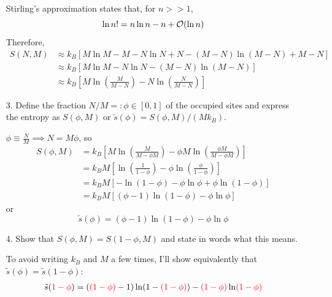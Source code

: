 \documentclass[a4paper,twoside]{article}
\begin{document}
\begin{itemize}
\begin{problem}
            Stirling's approximation states that, for $ n >> 1 $,
            \begin{equation}
                \ln n! = n\ln n - n + \order{\ln n} 
            \end{equation}
            Therefore,
            \begin{align}
                S(N,M) &\approx k_B \left[ M \ln M - M - N \ln N + N - (M - N) \ln (M - N) + M - N \right] \\
                &\approx k_B \left[ M \ln M - N \ln N - (M-N) \ln (M-N)\right] \\
                &\approx k_B \left[ M \ln\left( \frac{M}{M-N} \right) - N \ln\left( \frac{N}{M-N} \right)\right]
            \end{align}
        \end{problem}
    \item[3.] Define the fraction $ N/M =: \phi \in [0,1] $ of the occupied sites and express the entropy as $ S(\phi, M) $ or $ \tilde{s}(\phi) = S(\phi, M) / (M k_B) $.
        \begin{problem}
            $ \phi \equiv \frac{N}{M} \implies N = M \phi $, so
            \begin{align}
                S(\phi, M) &= k_B \left[ M \ln\left( \frac{M}{M - \phi M} \right) - \phi M \ln\left( \frac{\phi M}{M - \phi M} \right) \right] \\
                &= k_B M \left[ \ln\left( \frac{1}{1 - \phi} \right) - \phi\ln\left( \frac{\phi}{1-\phi} \right)\right] \\
                &= k_B M \left[ -\ln(1-\phi) - \phi\ln\phi + \phi\ln(1-\phi)\right] \\
                &= k_B M \left[ (\phi - 1)\ln(1 - \phi) - \phi\ln\phi\right]
            \end{align}
            or
            \begin{equation}
                \tilde{s}(\phi) = (\phi - 1)\ln(1 - \phi) - \phi\ln\phi
            \end{equation}
        \end{problem}
    \item[4.] Show that
        \subitem[(i)] $ S(\phi, M) = S(1 - \phi, M) $ and state in words what this means.
        \begin{problem}
            To avoid writing $ k_B $ and $ M $ a few times, I'll show equivalently that $ \tilde{s}(\phi) = \tilde{s}(1-\phi) $:
            \begin{align}
                \tilde{s}(\color{red}1-\phi\color{black}) &= (\color{red}(1-\phi)\color{black} - 1 ) \ln(1 -\color{red} (1-\phi)\color{black}) - \color{red}(1-\phi)\color{black}\ln\color{red}(1-\phi)\color{black}\\

\end{align}
\end{problem}
\end{itemize}
\end{document}

